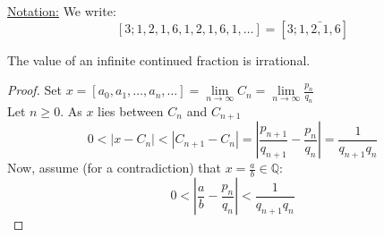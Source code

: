 \documentclass{report}
\begin{document}
												
\underline{Notation:} We write: \[[3;1,2,1,6,1,2,1,6,1,\dots]=[3;\bar{1,2,1,6}]\]
																
\begin{thm} The value of an infinite continued fraction is irrational.\end{thm}
\begin{proof} Set $x=[a_0,a_1,\dots,a_n,\dots]=\lim\limits_{n\to \infty} C_n=\lim\limits_{n\to \infty} \frac{p_n}{q_n}$\\
							Let $n\geq 0$. As $x$ lies between $C_n$ and $C_{n+1}$ \[0<|x-C_n|<|C_{n+1}-C_n|=|\frac{p_{n+1}}{q_{n+1}}-\frac{p_n}{q_n}|=\frac{1}{q_{n+1}q_n}\]
							Now, assume (for a contradiction) that $x=\frac{a}{b} \in \mathbb{Q}$:
																								\[0<|\frac{a}{b}-\frac{p_n}{q_n}|<\frac{1}{q_{n+1}q_n}\]
\end{proof}
												
\end{document}

